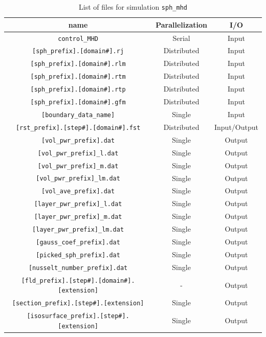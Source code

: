 \begin{table}[htp]
\caption{List of files for simulation {\tt sph\_mhd} }
\begin{center} 
\begin{tabular}{|c|c|c|}
\hline
 name & Parallelization & I/O \\ \hline \hline
\verb|control_MHD| & Serial & Input \\ \hline
\verb|[sph_prefix].[domain#].rj|  & Distributed & Input \\
\verb|[sph_prefix].[domain#].rlm| & Distributed & Input \\
\verb|[sph_prefix].[domain#].rtm| & Distributed & Input \\
\verb|[sph_prefix].[domain#].rtp| & Distributed & Input \\ \hline
\verb|[sph_prefix].[domain#].gfm| & Distributed & Input \\ \hline
\verb|[boundary_data_name]| & Single & Input \\ \hline
\verb|[rst_prefix].[step#].[domain#].fst| &  Distributed & Input/Output  \\ \hline
\verb|[vol_pwr_prefix].dat| & Single & Output \\ \hline
\verb|[vol_pwr_prefix]_l.dat| & Single & Output \\
\verb|[vol_pwr_prefix]_m.dat| & Single & Output \\
\verb|[vol_pwr_prefix]_lm.dat| & Single & Output \\
\verb|[vol_ave_prefix].dat| & Single & Output \\ \hline
\verb|[layer_pwr_prefix]_l.dat| & Single & Output \\
\verb|[layer_pwr_prefix]_m.dat| & Single & Output \\
\verb|[layer_pwr_prefix]_lm.dat| & Single & Output \\ \hline
\verb|[gauss_coef_prefix].dat| & Single & Output   \\
\verb|[picked_sph_prefix].dat| & Single & Output   \\ \hline
\verb|[nusselt_number_prefix].dat| & Single & Output   \\ \hline
\verb|[fld_prefix].[step#].[domain#].[extension]| &  - & Output  \\ \hline
\verb|[section_prefix].[step#].[extension]| &  Single & Output  \\
\verb|[isosurface_prefix].[step#].[extension]| &  Single & Output  \\ \hline
\end{tabular}
\end{center}
\label{table:sph_mhd}
\end{table}
%
\newpage
